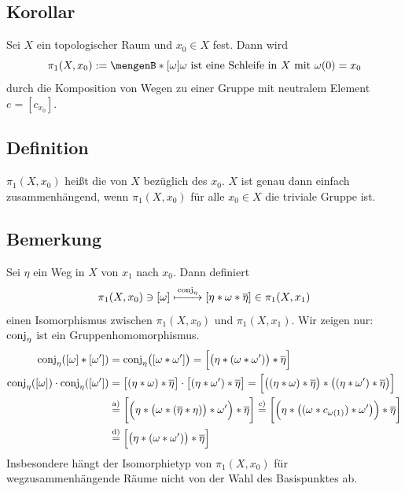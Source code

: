 \subsection[Korollar: Gruppenstruktur auf der Menge der Homotopieklassen von Schleifen]{Korollar} %
\label{sub:99}
Sei $X$ ein topologischer Raum und $x_0 \in X$ fest. Dann wird 
\[
	\pi_1 (X, x_0) := \set[{[\omega]}]{\omega \text{ ist eine Schleife in }X \text{ mit } \omega(0)= x_0} 
\]
durch die Komposition von Wegen zu einer Gruppe mit neutralem Element $e= [c_{x_0}]$.

\subsection[Definition: Fundamentalgruppe]{Definition} %
\label{sub:910}
$\pi_1(X, x_0)$ heißt die  von $X$ bezüglich des  $x_0$.
$X$ ist genau dann einfach zusammenhängend, wenn $\pi_1(X,x_0)$ für alle $x_0 \in X$ die triviale Gruppe ist.

\subsection[Bemerkung: Isomorphie zwischen Fundamentalgruppen]{Bemerkung} %
\label{sub:911}
Sei $\eta$ ein Weg in $X$ von $x_1$ nach $x_0$. Dann definiert
\[
	\pi_1(X,x_0) \ni [\omega] \xmapsto{\, \conj_\eta} \benbrace*{\eta * \omega * \overline{\eta}}  \in \pi_1(X,x_1)
\]
einen Isomorphismus zwischen $\pi_1(X,x_0)$ und $\pi_1(X,x_1)$. Wir zeigen nur: $\conj_\eta$ ist ein Gruppenhomomorphismus.
\begin{align*}
	\conj_\eta \enbrace*{ \benbrace*{\omega} * \benbrace*{\omega'}} &= \conj_\eta \enbrace[\big]{ \benbrace*{\omega * \omega'}} = \benbrace[\Big]{ \enbrace[\big]{\eta * (\omega * \omega')} * \overline{\eta}  }  \\
	\conj_\eta \enbrace*{[\omega]} \cdot \conj_\eta \enbrace*{[\omega']} &= \benbrace[\big]{(\eta * \omega) * \overline{\eta} } \cdot  \benbrace[\big]{(\eta * \omega') * \overline{\eta}} = \benbrace[\Big]{ \enbrace[\big]{ \enbrace*{\eta * \omega}* \overline{\eta}  } * \enbrace[\big]{\enbrace*{\eta * \omega'} * \overline{\eta}  }  } \\
	&\stackrel{\text{a)}}{=} \benbrace[\bigg]{ \enbrace[\Big]{\eta * \enbrace[\big]{\omega * \enbrace*{\overline{\eta} * \eta } }* \omega' } * \overline{\eta}  } 
	\stackrel{\text{c)}}{=} \benbrace[\bigg]{\enbrace[\Big]{ \eta * \enbrace[\big]{\enbrace{\omega * c_{\omega(1)}} * \omega' } } * \overline{\eta}} \\
	&\stackrel{\text{d)}}{=}
	\benbrace[\Big]{\enbrace[\big]{\eta * \enbrace*{\omega * \omega'} } * \overline{\eta}  } 
\end{align*}
Insbesondere hängt der Isomorphietyp von $\pi_1(X,x_0)$ für wegzusammenhängende Räume nicht von der Wahl des Basispunktes ab.
\newpage

